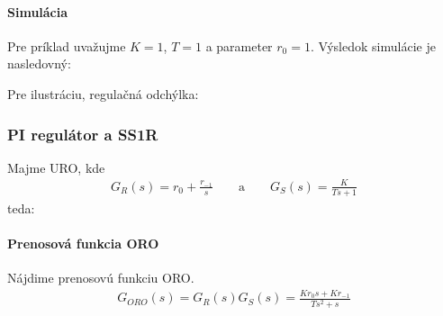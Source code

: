 \documentclass[a4paper, 10pt, ]{article}
\begin{document}
\paragraph{Simulácia}

Pre príklad uvažujme $K = 1$, $T = 1$ a parameter $r_0 = 1$. Výsledok simulácie je nasledovný:


\begin{center}



    \figcaption{}

\end{center}

\noindent
Pre ilustráciu, regulačná odchýlka:


\begin{center}



    \figcaption{}

\end{center}








\subsubsection{PI regulátor a SS1R}

Majme URO, kde
\begin{align}
    G_R(s) = r_0 + \frac{r_{-1}}{s} \qquad \text{a} \qquad  G_S(s) = \frac{K}{Ts+1}
\end{align}
teda:

\begin{center}

    \makebox[\textwidth][c]{%
    
    }

	\figcaption{}
	\label{URO_PI_SS1R}

\end{center}


\paragraph{Prenosová funkcia ORO}
Nájdime prenosovú funkciu ORO.
\begin{align}
    G_{ORO}(s) = G_R(s) G_S(s) =  \frac{K r_0 s + Kr_{-1}}{Ts^2+s}
\end{align}
\end{document}
